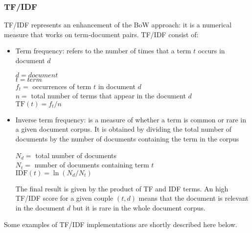 \documentclass[\main/main.tex]{subfiles}
\begin{document}
\subsubsection{TF/IDF}
TF/IDF represents an enhancement of the BoW approach: it is a numerical measure that works on term-document pairs. TF/IDF consist of:
\begin{itemize}
    \item Term frequency: refers to the number of times that a term $t$ occurs in document $d$
    \begin{center}
        $d=document$\\
        $t=term$\\
        $f_t=$  occurrences of term $t$ in document $d$\\
        $n =$ total number of terms that appear in the document $d$ \\
        $\mathrm{TF}(t) = f_t / n$
    \end{center}
    \item Inverse term frequency: is a measure of whether a term is common or rare in a given document corpus. It is obtained by dividing the total number of documents by the number of documents containing the term in the corpus \cite{NETTLETON2014171}
    \begin{center}
        $N_d = $ total number of documents\\
        $N_t = $ number of documents containing term $t$\\
        $\mathrm{IDF}(t) = \ln(N_d/N_t)$
    \end{center}
    The final result is given by the product of TF and IDF terms. An high TF/IDF score for a given couple $(t, d)$ means that the document is relevant in the document $d$ but it is rare in the whole document corpus.
\end{itemize}
Some examples of TF/IDF implementations are shortly described here below.
\end{document}
